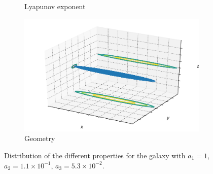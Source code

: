 \begin{figure}[h]
\begin{subfigure}[t]{0.4\textwidth}
        \caption{Lyapunov exponent}
    \end{subfigure}
    \begin{subfigure}[t]{0.4\textwidth}
        \includegraphics[width=\textwidth]{"../Files/Week 13/images/4_ellipsoid"}
        \caption{Geometry}
    \end{subfigure}
    \caption{Distribution of the different properties for the galaxy with $a_1 = 1$, $a_2 = 1.1\times10^{-1}$, $a_3 = 5.3\times10^{-2}$.}
    \label{fig: g26}
\end{figure}


